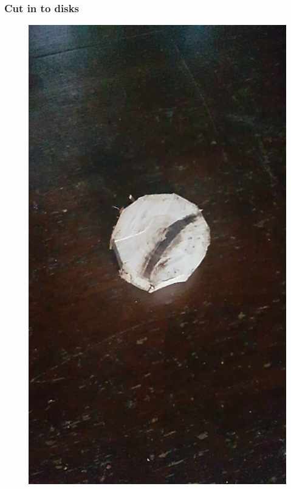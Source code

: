 \documentclass{beamer}
\begin{document}
\begin{frame}
\frametitle{Cut in to disks}
\begin{figure}
\includegraphics[height=.7\textheight]{images/wooden-disk.jpeg}
\end{figure}
\end{frame}
\end{document}
